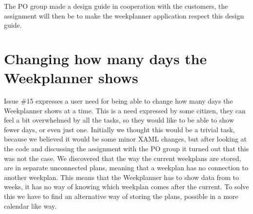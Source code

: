 The \gls{PO} group made a design guide in cooperation with the customers, the assignment will then be to make the weekplanner application respect this design guide.

\section{Changing how many days the Weekplanner shows}\label{sec:weekPlannerDaysToShow}

Issue \#15 expresses a user need for being able to change how many days the Weekplanner shows at a time. This is a need expressed by some citizen, they can feel a bit overwhelmed by all the tasks, so they would like to be able to show fewer days, or even just one.
Initially we thought this would be a trivial task, because we believed it would be some minor \gls{XAML} changes, but after looking at the code and discussing the assignment with the \gls{PO} group it turned out that this was not the case. We discovered that the way the current weekplans are stored, are in separate unconnected plans, meaning that a weekplan has no connection to another weekplan. This means that the Weekplanner has to show data from to weeks, it has no way of knowing which weekplan comes after the current.
To solve this we have to find an alternative way of storing the plans, possible in a more calendar like way.
